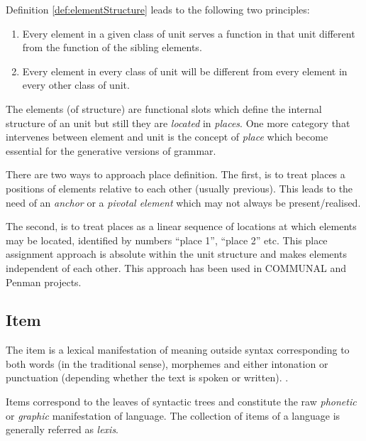 \begin{generalization}[]
	Definition \ref{def:elementStructure} leads to the following two principles:
	\begin{enumerate}
		\item Every element in a given class of unit serves a function in that unit different from the function of the sibling elements.
		\item Every element in every class of unit will be different from every element in every other class of unit. \citep[p.214]{Fawcett2000}
	\end{enumerate}
\end{generalization} 

The elements (of structure) are functional slots which define the internal structure of an unit but still they are \textit{located} in \textit{places}. One more category that intervenes between element and unit is the concept of \textit{place} which become essential for the generative versions of grammar.

There are two ways to approach place definition. The first, is to treat places a positions of elements relative to each other (usually previous). This leads to the need of an \textit{anchor} or a  \textit{pivotal element} which may not always be present/realised. 

The second, is to treat places as a linear sequence of locations at which elements may be located, identified by numbers ``place 1'', ``place 2'' etc. This place assignment approach is absolute within the unit structure and makes elements independent of each other. This approach has been used in COMMUNAL and Penman projects. 

\subsection{Item}
\begin{definition}[Item]\label{def:item}
	The item is a lexical manifestation of meaning outside syntax corresponding to both words (in the traditional sense), morphemes and either intonation or punctuation (depending whether the text is spoken or written). \citep[pp.226--232]{Fawcett2000}. 
\end{definition}

Items correspond to the leaves of syntactic trees and constitute the raw \textit{phonetic} or \textit{graphic} manifestation of language. The collection of items of a language is generally referred as \textit{lexis}.

